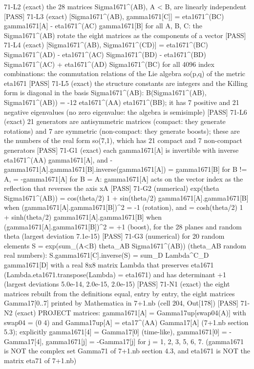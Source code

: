 \documentclass[
  10pt,
]{article}
\newenvironment{Shaded}{}{}
\newcommand{\NormalTok}[1]{#1}
\begin{document}
\begin{Shaded}
\begin{Highlighting}[]
\NormalTok{[PASS] 71{-}L2  (exact) the 28 matrices Sigma1671\^{}(AB), A \textless{} B, are linearly independent}
\NormalTok{[PASS] 71{-}L3  (exact) [Sigma1671\^{}(AB), gamma1671[C]] = eta1671\^{}(BC) gamma1671[A] {-} eta1671\^{}(AC) gamma1671[B] for all A, B, C: the Sigma1671\^{}(AB) rotate the eight matrices as the components of a vector}
\NormalTok{[PASS] 71{-}L4  (exact) [Sigma1671\^{}(AB), Sigma1671\^{}(CD)] = eta1671\^{}(BC) Sigma1671\^{}(AD) {-} eta1671\^{}(AC) Sigma1671\^{}(BD) {-} eta1671\^{}(BD) Sigma1671\^{}(AC) + eta1671\^{}(AD) Sigma1671\^{}(BC) for all 4096 index combinations: the commutation relations of the Lie algebra so(p,q) of the metric eta1671}
\NormalTok{[PASS] 71{-}L5  (exact) the structure constants are integers and the Killing form is diagonal in the basis Sigma1671\^{}(AB): B(Sigma1671\^{}(AB), Sigma1671\^{}(AB)) = {-}12 eta1671\^{}(AA) eta1671\^{}(BB); it has 7 positive and 21 negative eigenvalues (no zero eigenvalue: the algebra is semisimple)}
\NormalTok{[PASS] 71{-}L6  (exact) 21 generators are antisymmetric matrices (compact: they generate rotations) and 7 are symmetric (non{-}compact: they generate boosts); these are the numbers of the real form so(7,1), which has 21 compact and 7 non{-}compact generators}
\NormalTok{[PASS] 71{-}G1  (exact) each gamma1671[A] is invertible with inverse eta1671\^{}(AA) gamma1671[A], and {-}gamma1671[A].gamma1671[B].inverse(gamma1671[A]) = gamma1671[B] for B != A, = {-}gamma1671[A] for B = A: gamma1671[A] acts on the vector index as the reflection that reverses the axis xA}
\NormalTok{[PASS] 71{-}G2  (numerical) exp(theta Sigma1671\^{}(AB)) = cos(theta/2) 1 + sin(theta/2) gamma1671[A].gamma1671[B] when (gamma1671[A].gamma1671[B])\^{}2 = {-}1 (rotation), and = cosh(theta/2) 1 + sinh(theta/2) gamma1671[A].gamma1671[B] when (gamma1671[A].gamma1671[B])\^{}2 = +1 (boost), for the 28 planes and random theta (largest deviation 7.1e{-}15)}
\NormalTok{[PASS] 71{-}G3  (numerical) for 20 random elements S = exp(sum\_(A\textless{}B) theta\_AB Sigma1671\^{}(AB)) (theta\_AB random real numbers):  S.gamma1671[C].inverse(S) = sum\_D Lambda\^{}C\_D gamma1671[D] with a real 8x8 matrix Lambda that preserves eta1671 (Lambda.eta1671.transpose(Lambda) = eta1671) and has determinant +1 (largest deviations 5.0e{-}14, 2.0e{-}15, 2.0e{-}15)}
\NormalTok{[PASS] 71{-}N1  (exact) the eight matrices rebuilt from the definitions equal, entry by entry, the eight matrices Gamma17[0..7] printed by Mathematica in 7+1.nb (cell 204, Out[178])}
\NormalTok{[PASS] 71{-}N2  (exact) PROJECT matrices: gamma1671[A] = Gamma17up[swap04(A)] with swap04 = (0 4) and Gamma17up[A] = eta17\^{}(AA) Gamma17[A] (7+1.nb section 5.3); explicitly gamma1671[4] = Gamma17[0] (time{-}like), gamma1671[0] = {-}Gamma17[4], gamma1671[j] = {-}Gamma17[j] for j = 1, 2, 3, 5, 6, 7.  (gamma1671 is NOT the complex set Gamma71 of 7+1.nb section 4.3, and eta1671 is NOT the matrix eta71 of 7+1.nb)}

\end{Highlighting}
\end{Shaded}
\end{document}
